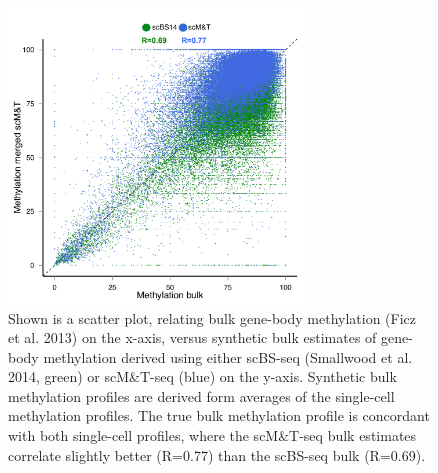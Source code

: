 \begin{figure}[htbp!]
\centering
\includegraphics[width=0.7\textwidth]{bulk}
\caption[Correlation between single-cell methylomes and the methylome of a bulk cell population.]{Shown is a scatter plot, relating bulk gene-body methylation (Ficz et al. 2013) on the x-axis, versus synthetic bulk estimates of gene- body methylation derived using either scBS-seq (Smallwood et al. 2014, green) or scM\&T-seq (blue) on the y-axis. Synthetic bulk methylation profiles are derived form averages of the single-cell methylation profiles. The true bulk methylation profile is concordant with both single-cell profiles, where the scM\&T-seq bulk estimates correlate slightly better (R=0.77) than the scBS-seq bulk (R=0.69).}
\label{fig:mt_bulk}
\end{figure}


